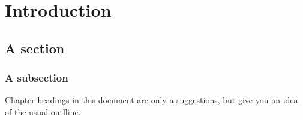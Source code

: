 \chapter{Introduction}
\section{ A section}
\subsection{A subsection}
Chapter headings in this document are only a suggestions, but give you an idea of the usual outlline. 

